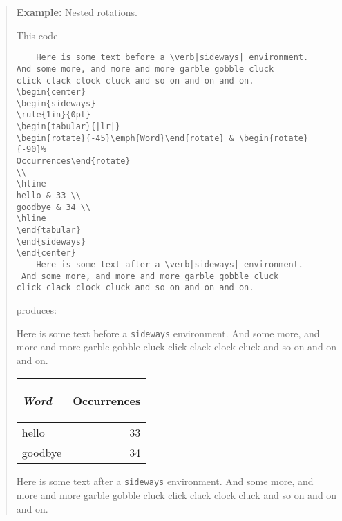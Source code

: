 \documentclass[11pt]{article}
\newenvironment{example}{\begin{quotation}\small\textbf{Example: }}{\par\end{quotation}}
\begin{document}
\begin{example}Nested rotations. \label{ex:sidetabular}

This code
\begin{verbatim}
    Here is some text before a \verb|sideways| environment. 
And some more, and more and more garble gobble cluck
click clack clock cluck and so on and on and on.
\begin{center}
\begin{sideways}
\rule{1in}{0pt}
\begin{tabular}{|lr|}
\begin{rotate}{-45}\emph{Word}\end{rotate} & \begin{rotate}{-90}%
Occurrences\end{rotate}
\\
\hline
hello & 33 \\
goodbye & 34 \\
\hline
\end{tabular}
\end{sideways}
\end{center}
    Here is some text after a \verb|sideways| environment.
 And some more, and more and more garble gobble cluck
click clack clock cluck and so on and on and on.
\end{verbatim}
produces:

    Here is some text before a \verb|sideways| environment. 
And some more, and more and more garble gobble cluck
click clack clock cluck and so on and on and on.
\begin{center}
\begin{sideways}
\begin{tabular}{|lr|}
\begin{rotate}{-45}\emph{Word}\end{rotate} & \begin{rotate}{-90}%
Occurrences\end{rotate} \\ \hline
hello & 33 \\
goodbye & 34 \\ \hline
\end{tabular}
\end{sideways}
\end{center}
    Here is some text after a \verb|sideways| environment.
 And some more, and more and more garble gobble cluck
click clack clock cluck and so on and on and on.
\end{example} %
\end{document}
